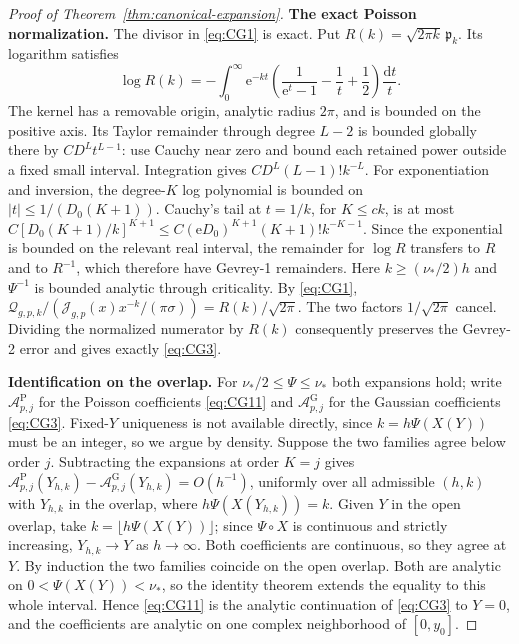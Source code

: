 \begin{proof}[Proof of Theorem~\ref{thm:canonical-expansion}]
\textbf{The exact Poisson normalization.} The divisor in \eqref{eq:CG1} is exact. Put
$R(k)=\sqrt{2\pi k}\,\mathfrak p_k$. Its logarithm satisfies
\[
 \log R(k)=-\int_0^\infty \mathrm{e}^{-kt}
 \left(\frac1{\mathrm{e}^t-1}-\frac1t+\frac12\right)\frac{\mathrm{d}t}{t}.
\]
The kernel has a removable origin, analytic radius $2\pi$, and is
bounded on the positive axis. Its Taylor remainder through degree
$L-2$ is bounded globally there by $CD^Lt^{L-1}$: use Cauchy near
zero and bound each retained power outside a fixed small interval.
Integration gives $CD^L(L-1)!k^{-L}$.
For exponentiation and inversion, the degree-$K$ log polynomial is
bounded on $|t|\le1/(D_0(K+1))$. Cauchy's tail at $t=1/k$, for
$K\le c k$, is at most
$C[D_0(K+1)/k]^{K+1}\le C(\mathrm{e}D_0)^{K+1}(K+1)!k^{-K-1}$.
Since the exponential is bounded on the relevant real interval, the
remainder for $\log R$ transfers to $R$ and to $R^{-1}$, which
therefore have Gevrey-1 remainders. Here $k\ge(\nu_*/2)h$ and $\Psi^{-1}$ is
bounded analytic through criticality. By \eqref{eq:CG1},
$\mathcal Q_{g,p,k}/(\mathcal J_{g,p}(x)x^{-k}/(\pi\sigma))
=R(k)/\sqrt{2\pi}$. The two factors $1/\sqrt{2\pi}$ cancel.
Dividing the normalized numerator by $R(k)$ consequently preserves
the Gevrey-2 error and gives exactly
\eqref{eq:CG3}.

\textbf{Identification on the overlap.} For $\nu_*/2\le\Psi\le\nu_*$
both expansions hold; write $\mathcal A^{\mathrm P}_{p,j}$ for the
Poisson coefficients \eqref{eq:CG11} and $\mathcal A^{\mathrm G}_{p,j}$
for the Gaussian coefficients \eqref{eq:CG3}. Fixed-$Y$ uniqueness is
not available directly, since $k=h\Psi(X(Y))$ must be an integer, so we
argue by density. Suppose the two families agree below order $j$.
Subtracting the expansions at order $K=j$ gives
$\mathcal A^{\mathrm P}_{p,j}(Y_{h,k})-\mathcal A^{\mathrm G}_{p,j}(Y_{h,k})=O(h^{-1})$,
uniformly over all admissible $(h,k)$ with $Y_{h,k}$ in the overlap,
where $h\Psi(X(Y_{h,k}))=k$. Given $Y$ in the open overlap, take
$k=\lfloor h\Psi(X(Y))\rfloor$; since $\Psi\circ X$ is continuous and
strictly increasing, $Y_{h,k}\to Y$ as $h\to\infty$. Both coefficients
are continuous, so they agree at $Y$. By induction the two families
coincide on the open overlap. Both are analytic on
$0<\Psi(X(Y))<\nu_*$, so the identity theorem extends the equality to
this whole interval. Hence \eqref{eq:CG11} is the analytic continuation
of \eqref{eq:CG3} to $Y=0$, and the coefficients are analytic on one
complex neighborhood of $[0,y_0]$.


\end{proof}
